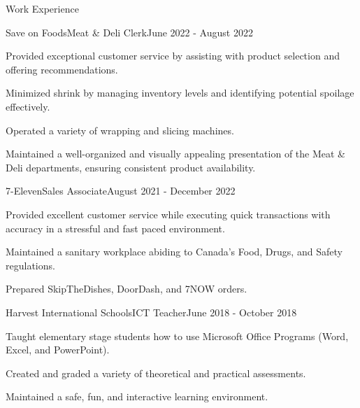 \documentclass{article}
\newlength{\tabin}
\newlength{\secsep}
\newcommand{\lineunder}{\vspace*{-8pt} \\ \hspace*{-6pt} \hrulefill \\ \vspace*{-15pt}}
\newenvironment{tabbedsection}[1]{
    \begin{list}{}{
        \setlength{\itemsep}{0pt}
        \setlength{\labelsep}{0pt}
        \setlength{\labelwidth}{0pt}
        \setlength{\leftmargin}{\tabin}
        \setlength{\rightmargin}{\tabin}
        \setlength{\listparindent}{0pt}
        \setlength{\parsep}{0pt}
        \setlength{\parskip}{0pt}
        \setlength{\partopsep}{0pt}
        \setlength{\topsep}{#1}
    }
        \item[]
        }{
    \end{list}}
\newenvironment{resume_section}[1]{
    \filbreak
    \vspace{2\secsep}
    \textsc{\large#1}
    \lineunder
    \begin{tabbedsection}{\secsep}
    }{\end{tabbedsection}}
\newenvironment{subitems}{
    \renewcommand{\labelitemi}{-}
    \begin{itemize}
        \setlength{\labelsep}{1em}
        }{
    \end{itemize}}
\newenvironment{resume_employer}[4]{
    \vspace{\secsep}
    \begin{minipage}[t]{0.75\linewidth}
        \textbf{#1}\\
        \small #2
    \end{minipage}%
    \begin{minipage}[t]{0.25\linewidth}
        \hfill \footnotesize #4
    \end{minipage}
    \vspace{0.1em}\\
    \begin{tabbedsection}{0pt}
        \begin{subitems}
        }{\end{subitems}
    \end{tabbedsection}}
\begin{document}
\begin{resume_section}{Work Experience}
        \begin{resume_employer}{Save on Foods}{Meat \& Deli Clerk}{}{June 2022 - August 2022}
            \item Provided exceptional customer service by assisting with product selection and offering
            recommendations.
            \item Minimized shrink by managing inventory levels and identifying potential spoilage effectively.
            \item Operated a variety of wrapping and slicing machines.
            \item Maintained a well-organized and visually appealing presentation of the Meat \& Deli departments, ensuring consistent product availability.
        \end{resume_employer}

        \begin{resume_employer}{7-Eleven}{Sales Associate}{}{August 2021 - December 2022}
            \item Provided excellent customer service while executing quick transactions with accuracy in a stressful
            and fast paced environment.

            \item Maintained a sanitary workplace abiding to Canada's Food, Drugs, and Safety regulations.

            \item Prepared SkipTheDishes, DoorDash, and 7NOW orders.
        \end{resume_employer}

        \begin{resume_employer}{Harvest International Schools}{ICT Teacher}{}{June 2018 - October 2018}
        \item Taught elementary stage students how to use Microsoft Office Programs (Word, Excel, and PowerPoint).

        \item Created and graded a variety of theoretical and practical assessments.

        \item Maintained a safe, fun, and interactive learning environment.
      \end{resume_employer}

    \end{resume_section}
\end{document}
